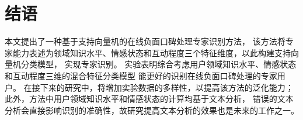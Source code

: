 \section{结语}\label{sec:2.4}
本文提出了一种基于支持向量机的在线负面口碑处理专家识别方法，
该方法将专家能力表述为领域知识水平、情感状态和互动程度三个特征维度，以此构建支持向量机分类模型，
实现专家识别。
实验表明综合考虑用户领域知识水平、情感状态和互动程度三维的混合特征分类模型
能更好的识别在线负面口碑处理的专家用户。
在接下来的研究中，将增加实验数据的多样性，以提高该方法的泛化能力；
此外，方法中用户领域知识水平和情感状态的计算均基于文本分析，
错误的文本分析会直接影响识别的准确性，故研究提高文本分析的效果也是未来的工作之一。